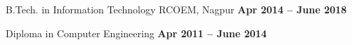 \documentclass[11pt, a4paper]{awesome-cv}
\begin{document}
\vspace{-0.4em}

\begin{cventries}
\cventry{} {B.Tech. in Information Technology RCOEM, Nagpur} {\textbf{Apr 2014 – June 2018}} {} {}
\end{cventries}
\vspace{-3.6em}
\begin{cventries}
\cventry{} {Diploma in Computer Engineering} {\textbf{Apr 2011 – June 2014}} {} {}
\end{cventries}
\end{document}
